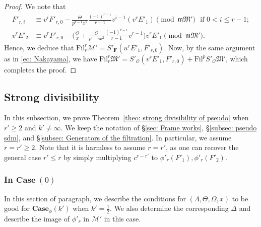 \documentclass[11pt]{amsart}
\theoremstyle{definition}
\numberwithin{equation}{subsection}
\theoremstyle{plain}
\theoremstyle{plain}
\theoremstyle{plain}
\theoremstyle{plain}
\theoremstyle{plain}
\theoremstyle{plain}
\theoremstyle{plain}
\theoremstyle{plain}
\theoremstyle{plain}
\theoremstyle{plain}
\theoremstyle{plain}
\theoremstyle{plain}
\theoremstyle{definition}
\theoremstyle{definition}
\theoremstyle{definition}
\theoremstyle{remark}
\renewcommand{\(}{\textup{(}}
\renewcommand{\)}{\textup{)}}
\newcommand{\F}{\mathbf{F}}
\newcommand{\barS}{\overline{S}}
\newcommand{\cM}{\mathcal{M}}
\newcommand{\fM}{\mathfrak{M}}
\newcommand{\fm}{\mathfrak{m}}
\newcommand{\Fil}{\mathrm{Fil}}
\newcommand{\cO}{\mathcal{O}}
\newcommand{\barE}{\overline{E}}
\newcommand{\barF}{\overline{F}}
\begin{document}
\begin{proof}
We note that
\begin{align*}
F'_{r,i}
   & \equiv
    v^iF'_{r,0}-\frac{\Theta}{p^{r-1}x^2}\frac{(-1)^{r-1}}{r-1}v^{i-1}(v^rE'_1)
    \pmod{\fm\fM'}\,\,\mbox{ if }0<i\leq r-1;\\
v^rE'_2
    &\equiv
    v^rF'_{r,0}
    -\bigg(\frac{\Theta}{x}+\frac{\Theta}{p^{r-1}x^2}\frac{(-1)^{r-1}}{r-1}v^{r-1}\bigg)v^rE'_1
    \pmod{\fm\fM'}.
\end{align*}
Hence, we deduce that $\Fil^r_{r}\cM'=\barS'_\F(u^r\barE'_1,\barF'_{r,0})$. Now, by the same argument as in \eqref{eq: Nakayama}, we have $\Fil^r_{r}\fM'=S'_\cO(v^rE'_1,F'_{r,0})+\Fil^pS'_\cO\fM'$, which completes the proof.
\end{proof}













\subsection{Strong divisibility}\label{subsec: Strong divisibility}
In this subsection, we prove Theorem~\ref{theo: strong divisibility of pseudo} when $r'\geq 2$ and $k'\neq\infty$. We keep the notation of \S\ref{sec: Frame works}, \S\ref{subsec: pseudo sdm}, and \S\ref{subsec: Generators of the filtration}. In particular, we assume $r=r'\geq 2$. Note that it is harmless to assume $r=r'$, as one can recover the general case $r'\leq r$ by simply multiplying $c^{r-r'}$ to $\phi'_r(F'_1),\phi'_r(F'_2)$.

\subsubsection{\textbf{In $\mathbf{Case}~(0)$}}
In this section of paragraph, we describe the conditions for $(\Lambda,\Theta,\Omega,x)$ to be good for $\mathbf{Case}_\phi(k')$ when $k'=\frac{1}{2}$. We also determine the corresponding $\Delta$ and describe the image of $\phi'_r$ in $\cM'$ in this case.
\end{document}
